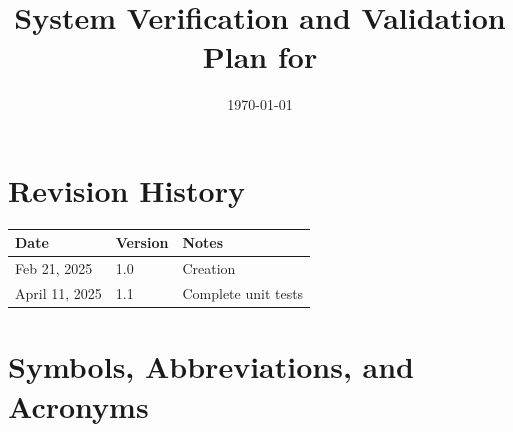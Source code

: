\documentclass[12pt, titlepage]{article}
\begin{document}
\title{System Verification and Validation Plan for \progname{}} 
\author{\authname}
\date{\today}
	
\maketitle


\section*{Revision History}

\begin{tabularx}{\textwidth}{p{3cm}p{2cm}X} \toprule {\bf Date} & {\bf Version}
& {\bf Notes}\\
\midrule
Feb 21, 2025 & 1.0 & Creation\\
April 11, 2025 & 1.1 & Complete unit tests\\
\bottomrule
\end{tabularx}



\newpage

\tableofcontents

\listoftables

\listoffigures

\newpage

\section{Symbols, Abbreviations, and Acronyms}
\end{document}
